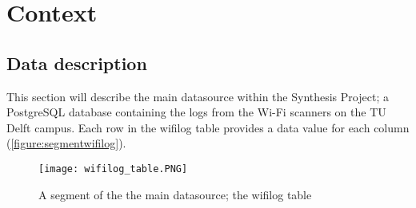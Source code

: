 \chapter{Context}\label{entrances} 
\section{Data description}\label{datadescription}
This section will describe the main datasource within the Synthesis Project; a PostgreSQL database containing the logs from the Wi-Fi scanners on the TU Delft campus. Each row in the wifilog table provides a data value for each column (\autoref{figure:segmentwifilog}).

\begin{figure}[H]
	\centering
	\texttt{[image: wifilog\_table.PNG]}
	\captionsetup{justification=centering}
	\caption{A segment of the the main datasource; the wifilog table}
	\label{figure:segmentwifilog}
\end{figure}

